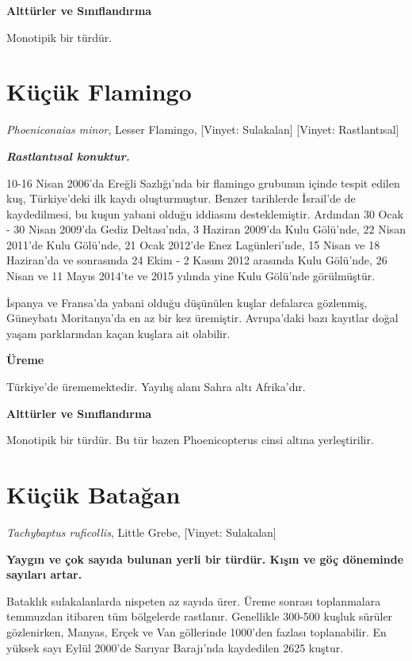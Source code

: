 \documentclass[
  letterpaper,
  DIV=11,
  numbers=noendperiod]{scrreprt}
\begin{document}
\textbf{Alttürler ve Sınıflandırma}

Monotipik bir türdür.

\section{Küçük Flamingo}\label{kuxfcuxe7uxfck-flamingo}

\emph{Phoeniconaias minor}, Lesser Flamingo, {[}Vinyet: Sulakalan{]}
{[}Vinyet: Rastlantısal{]}

\textbf{\emph{Rastlantısal konuktur.}}

10-16 Nisan 2006'da Ereğli Sazlığı'nda bir flamingo grubunun içinde
tespit edilen kuş, Türkiye'deki ilk kaydı oluşturmuştur. Benzer
tarihlerde İsrail'de de kaydedilmesi, bu kuşun yabani olduğu iddiasını
desteklemiştir. Ardından 30 Ocak - 30 Nisan 2009'da Gediz Deltası'nda, 3
Haziran 2009'da Kulu Gölü'nde, 22 Nisan 2011'de Kulu Gölü'nde, 21 Ocak
2012'de Enez Lagünleri'nde, 15 Nisan ve 18 Haziran'da ve sonrasında 24
Ekim - 2 Kasım 2012 arasında Kulu Gölü'nde, 26 Nisan ve 11 Mayıs 2014'te
ve 2015 yılında yine Kulu Gölü'nde görülmüştür.

İspanya ve Fransa'da yabani olduğu düşünülen kuşlar defalarca gözlenmiş,
Güneybatı Moritanya'da en az bir kez üremiştir. Avrupa'daki bazı
kayıtlar doğal yaşam parklarından kaçan kuşlara ait olabilir.

\textbf{Üreme}

Türkiye'de ürememektedir. Yayılış alanı Sahra altı Afrika'dır.

\textbf{Alttürler ve Sınıflandırma}

Monotipik bir türdür. Bu tür bazen Phoenicopterus cinsi altına
yerleştirilir.

\section{Küçük Batağan}\label{kuxfcuxe7uxfck-bataux11fan}

\emph{Tachybaptus ruficollis}, Little Grebe, {[}Vinyet: Sulakalan{]}

\textbf{Yaygın ve çok sayıda bulunan yerli bir türdür. Kışın ve göç
döneminde sayıları artar.}

Bataklık sulakalanlarda nispeten az sayıda ürer. Üreme sonrası
toplanmalara temmuzdan itibaren tüm bölgelerde rastlanır. Genellikle
300-500 kuşluk sürüler gözlenirken, Manyas, Erçek ve Van göllerinde
1000'den fazlası toplanabilir. En yüksek sayı Eylül 2000'de Sarıyar
Barajı'nda kaydedilen 2625 kuştur.
\end{document}
